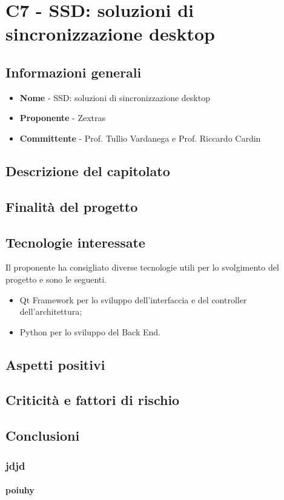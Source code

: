 \chapter{C7 - SSD: soluzioni di sincronizzazione desktop}
\section{Informazioni generali}
\begin{itemize}
	\item \textbf{Nome} - SSD: soluzioni di sincronizzazione desktop
	\item \textbf{Proponente} - Zextras
	\item \textbf{Committente} - Prof. Tullio Vardanega e Prof. Riccardo Cardin
\end{itemize}
\section{Descrizione del capitolato}
\section{Finalità del progetto}
\section{Tecnologie interessate}
Il proponente ha consigliato diverse tecnologie utili per lo svolgimento del progetto e sono le seguenti.
\begin{itemize}
	\item Qt Framework per lo sviluppo dell'interfaccia e del controller dell'architettura;
	\item Python per lo sviluppo del Back End.
\end{itemize}
\section{Aspetti positivi}
\section{Criticità e fattori di rischio}
\section{Conclusioni}
\subsection{jdjd}
\subsubsection{poiuhy}